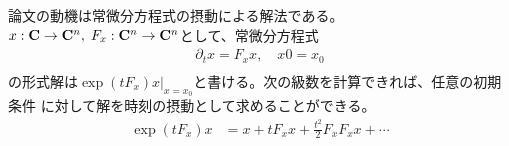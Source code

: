 	論文\cite{url:grossman:deform}の動機は常微分方程式の摂動による解法である。
	$x:{\mathbf{C}}\to {\mathbf{C}}^n,\;F_x:{\mathbf{C}}^n\to {\mathbf{C}}^n$として、常微分方程式
	\begin{equation}\begin{split} %
		\partial_tx = F_xx,\quad x0 = x_0 \\
	\end{split}\end{equation} %
	の形式解は$\exp(tF_x)x|_{x=x_0}$と書ける。次の級数を計算できれば、任意の初期条件
	に対して解を時刻の摂動として求めることができる。
	\begin{equation}\begin{split} %
		\exp(tF_x)x &= x + tF_xx + \frac{t^2}{2}F_xF_xx + \cdots \\
	\end{split}\end{equation} %

